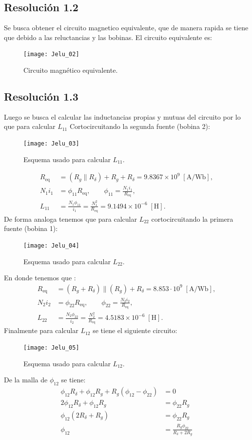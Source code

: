 \documentclass[
  11pt,
  letterpaper,
   addpoints,
  ]{exam}
\begin{document}
\begin{questions}
\begin{solution}
\subsection*{Resolución 1.2}
Se busca obtener el circuito magnetico equivalente, que de manera rapida se tiene que debido a las reluctancias y las bobinas. El circuito equivalente es:
\begin{figure}[H]
  \centering
  \texttt{[image: Jelu\_02]}
  \caption{Circuito magnético equivalente.}
\end{figure}

\subsection*{Resolución 1.3}
Luego se busca el calcular las inductancias propias y mutuas del circuito por lo que para calcular $L_11$ Cortocircuitando la segunda fuente (bobina 2):
\begin{figure}[H]
  \centering
  \texttt{[image: Jelu\_03]}
  \caption{Esquema usado para calcular \(L_{11}\).}
\end{figure}
\begin{align}
R_{\text{eq}} &= (R_g \parallel R_\delta) + R_g + R_\delta
               = 9.8367\times 10^{9}\;[\text{A/Wb}],\\
N_1 i_1 &= \phi_{11} R_{\text{eq}}, \qquad
\phi_{11}=\frac{N_1 i_1}{R_{\text{eq}}}, \\
L_{11} &= \frac{N_1\phi_{11}}{i_1}=\frac{N_1^2}{R_{\text{eq}}}
       = 9.1494\times10^{-6}\;[\text{H}].
\end{align}
De forma analoga tenemos que para calcular \(L_{22}\) cortocircuitando la primera fuente (bobina 1):
\begin{figure}[H]
  \centering
  \texttt{[image: Jelu\_04]}
  \caption{Esquema usado para calcular \(L_{22}\).}
\end{figure}
En donde tenemos que :
\begin{align}
R_{\text{eq}} &= (R_g + R_\delta) \parallel (R_g) + R_\delta
               = 8.853 \cdot 10^{9}\;[\text{A/Wb}],\\
N_2 i_2 &= \phi_{22} R_{\text{eq}}, \qquad
\phi_{22}=\frac{N_2 i_2}{R_{\text{eq}}}, \\
L_{22} &= \frac{N_2\phi_{22}}{i_2}=\frac{N_2^2}{R_{\text{eq}}}
       = 4.5183\times10^{-6}\;[\text{H}].
\end{align}
Finalmente para calcular \(L_{12}\) se tiene el siguiente circuito:
\begin{figure}[H]
    \centering
    \texttt{[image: Jelu\_05]}
    \caption{Esquema usado para calcular \(L_{12}\).}
\end{figure}
De la malla de $\phi_{12}$ se tiene:
\begin{align}
    \phi_{12} R_\delta + \phi_{12} R_g + R_g (\phi_{12} - \phi_{22}) &= 0 \\
    2\phi_{12} R_\delta + \phi_{12} R_g &= \phi_{22} R_g \\
    \phi_{12}(2R_\delta + R_g) &= \phi_{22} R_g \\
    \phi_{12} &= \frac{R_g \phi_{22}}{R_\delta + 2R_g}
\end{align}


\end{solution}
\end{questions}
\end{document}
